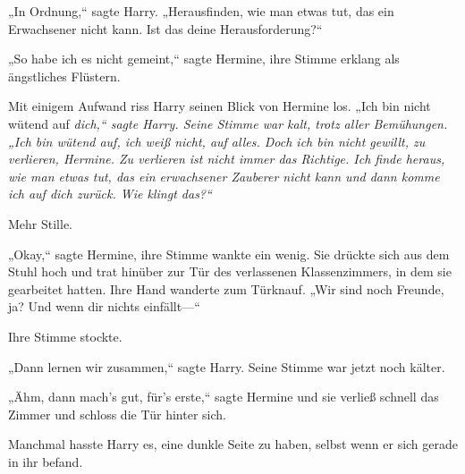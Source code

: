 „In Ordnung,“ sagte Harry. „Herausfinden, wie man etwas tut, das ein Erwachsener nicht kann. Ist das deine Herausforderung?“

„So habe ich es nicht gemeint,“ sagte Hermine, ihre Stimme erklang als ängstliches Flüstern.

Mit einigem Aufwand riss Harry seinen Blick von Hermine los. „Ich bin nicht wütend auf \emph{dich,“ sagte Harry. Seine Stimme war kalt, trotz aller Bemühungen. „Ich bin wütend auf, ich weiß nicht, auf alles. Doch ich bin nicht gewillt, zu verlieren, Hermine. Zu verlieren ist nicht immer das Richtige. Ich finde heraus, wie man etwas tut, das ein erwachsener Zauberer nicht kann und dann komme ich auf dich zurück. Wie klingt das?“}

Mehr Stille.

„Okay,“ sagte Hermine, ihre Stimme wankte ein wenig. Sie drückte sich aus dem Stuhl hoch und trat hinüber zur Tür des verlassenen Klassenzimmers, in dem sie gearbeitet hatten. Ihre Hand wanderte zum Türknauf. „Wir sind noch Freunde, ja? Und wenn dir nichts einfällt—“

Ihre Stimme stockte.

„Dann lernen wir zusammen,“ sagte Harry. Seine Stimme war jetzt noch kälter.

„Ähm, dann mach’s gut, für’s erste,“ sagte Hermine und sie verließ schnell das Zimmer und schloss die Tür hinter sich.

Manchmal hasste Harry es, eine dunkle Seite zu haben, selbst wenn er sich gerade in ihr befand.

